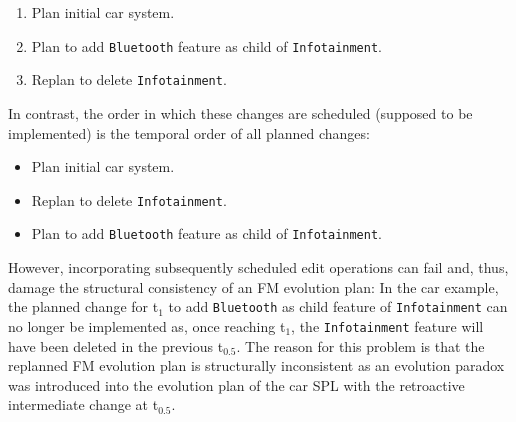 \documentclass[a4paper,english]{ifimaster}
\newcommand{\timepoint}[1]{t$_#1$}
\begin{document}
\begin{enumerate}
	\item [\timepoint{0}:] Plan initial car system.
	\item [\timepoint{1}:] Plan to add \texttt{Bluetooth} feature as child of \texttt{Infotainment}.
	\item [\timepoint{0.5}:] Replan to delete \texttt{Infotainment}.
\end{enumerate}
In contrast, the order in which these changes are scheduled (supposed to be implemented) is the temporal order of all planned changes:
\begin{itemize}
	\item [\timepoint{0}:] Plan initial car system.
	\item [\timepoint{0.5}:] Replan to delete \texttt{Infotainment}.
	\item [\timepoint{1}:] Plan to add \texttt{Bluetooth} feature as child of \texttt{Infotainment}.
\end{itemize}


However, incorporating subsequently scheduled edit operations can fail and, thus, damage the structural consistency of an FM evolution plan:
In the car example, the planned change for \timepoint{1} to add \texttt{Bluetooth} as child feature of \texttt{Infotainment} can no longer be implemented as, once reaching \timepoint{1}, the \texttt{Infotainment} feature will have been deleted in the previous \timepoint{0.5}.
The reason for this problem is that the replanned FM evolution plan is structurally inconsistent as an evolution paradox was introduced into the evolution plan of the car SPL with the retroactive intermediate change at \timepoint{0.5}.
\end{document}
